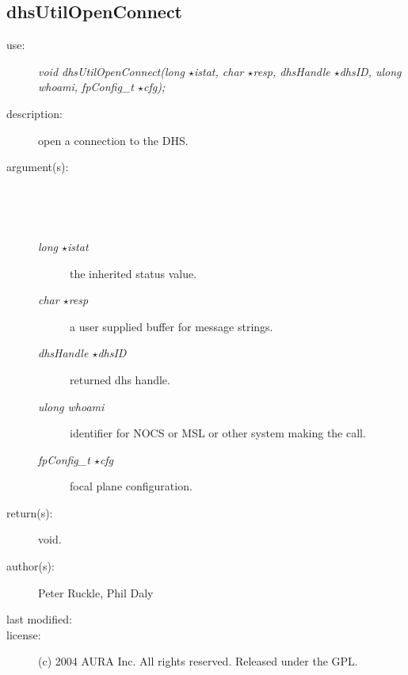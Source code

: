\subsection {dhsUtilOpenConnect} \begin{description} \item[\sc use:] \emph{void dhsUtilOpenConnect(long $\star$istat, char $\star$resp, dhsHandle $\star$dhsID, ulong whoami, fpConfig\_t $\star$cfg);} \item[\sc description:] open a connection to the DHS. \item[\sc argument(s):] \begin{description} \item[\ ] \ \item[\emph{long $\star$istat}] the inherited status value. \item[\emph{char $\star$resp}] a user supplied buffer for message strings. \item[\emph{dhsHandle $\star$dhsID}] returned dhs handle. \item[\emph{ulong whoami}] identifier for NOCS or MSL or other system making the call. \item[\emph{fpConfig\_t $\star$cfg}] focal plane configuration. \end{description} \item[\sc return(s):] void. \item[\sc author(s):] Peter Ruckle, Phil Daly \item[\sc last modified:] \item[\sc license:] (c) 2004 AURA Inc. All rights reserved. Released under the GPL. \end{description}
